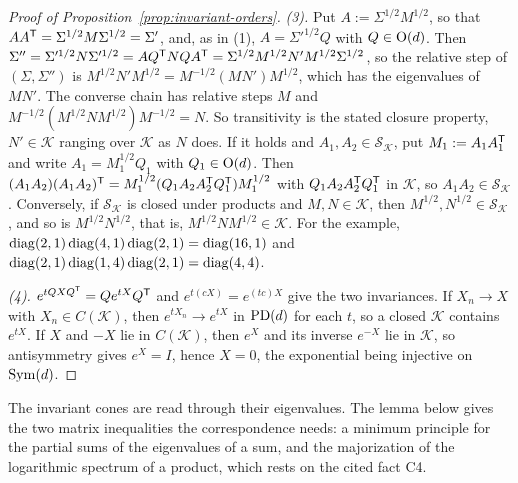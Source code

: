 \begin{proof}[Proof of Proposition~\ref{prop:invariant-orders}]
\emph{(3).} Put $A := \Sigma^{1/2}M^{1/2}$, so that $AA^{\mathsf{T}} = \Sigma^{1/2}M\Sigma^{1/2} = \Sigma'$,
and, as in (1), $A = \Sigma'^{1/2}Q$ with $Q \in \mathrm{O}(d)$. Then $\Sigma'' = \Sigma'^{1/2}N\Sigma'^{1/2}
= AQ^{\mathsf{T}}NQA^{\mathsf{T}} = \Sigma^{1/2}M^{1/2}N'M^{1/2}\Sigma^{1/2}$, so the relative step of
$(\Sigma, \Sigma'')$ is $M^{1/2}N'M^{1/2} = M^{-1/2}(MN')M^{1/2}$, which has the eigenvalues of $MN'$.
The converse chain has relative steps $M$ and $M^{-1/2}(M^{1/2}NM^{1/2})M^{-1/2} = N$. So transitivity
is the stated closure property, $N' \in \mathcal K$ ranging over $\mathcal K$ as $N$ does. If it holds
and $A_1, A_2 \in \mathcal S_{\mathcal K}$, put $M_1 := A_1A_1^{\mathsf{T}}$ and write $A_1 = M_1^{1/2}Q_1$ with
$Q_1 \in \mathrm{O}(d)$. Then $(A_1A_2)(A_1A_2)^{\mathsf{T}} = M_1^{1/2}(Q_1A_2A_2^{\mathsf{T}}Q_1^{\mathsf{T}})M_1^{1/2}$ with
$Q_1A_2A_2^{\mathsf{T}}Q_1^{\mathsf{T}}$ in $\mathcal K$, so $A_1A_2 \in \mathcal S_{\mathcal K}$. Conversely, if $\mathcal S_{\mathcal K}$ is closed under
products and $M, N \in \mathcal K$, then $M^{1/2}, N^{1/2} \in \mathcal S_{\mathcal K}$, and so is
$M^{1/2}N^{1/2}$, that is, $M^{1/2}NM^{1/2} \in \mathcal K$. For the example,
$\operatorname{diag}(2,1)\operatorname{diag}(4,1)\operatorname{diag}(2,1) = \operatorname{diag}(16,1)$ and $\operatorname{diag}(2,1)\operatorname{diag}(1,4)\operatorname{diag}(2,1) = \operatorname{diag}(4,4)$.

\emph{(4).} $e^{tQXQ^{\mathsf{T}}} = Qe^{tX}Q^{\mathsf{T}}$ and $e^{t(cX)} = e^{(tc)X}$ give the two invariances. If
$X_n \to X$ with $X_n \in C(\mathcal K)$, then $e^{tX_n} \to e^{tX}$ in $\mathrm{PD}(d)$ for each $t$, so a closed
$\mathcal K$ contains $e^{tX}$. If $X$ and $-X$ lie in $C(\mathcal K)$, then $e^X$ and its inverse
$e^{-X}$ lie in $\mathcal K$, so antisymmetry gives $e^X = I$, hence $X = 0$, the exponential being
injective on $\mathrm{Sym}(d)$.
\end{proof}

The invariant cones are read through their eigenvalues. The lemma below gives the two matrix
inequalities the correspondence needs: a minimum principle for the partial sums of the eigenvalues of a
sum, and the majorization of the logarithmic spectrum of a product, which rests on the cited
fact C4.

